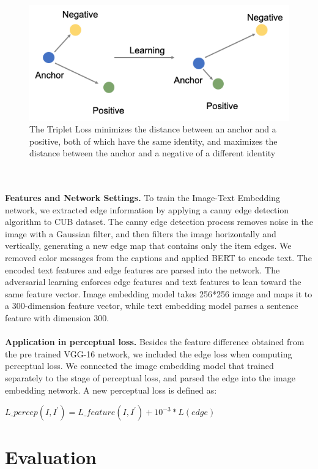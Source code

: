 \documentclass[10pt,twocolumn,letterpaper]{article}
\begin{document}
\begin{figure}
    \centering
    \includegraphics[width=0.95\columnwidth]{fig/tripletloss.png}
    \caption{The Triplet Loss minimizes the distance between an anchor and a positive, both of which have the same identity, and maximizes the distance between the anchor and a negative of a different identity}
    \label{triplet}
\end{figure}
\\\\
\textbf{Features and Network Settings.} To train the Image-Text Embedding network, we extracted edge information by applying a canny edge detection algorithm to CUB dataset. The canny edge detection process removes noise in the image with a Gaussian filter, and then filters the image horizontally and vertically, generating a new edge map that contains only the item edges. We removed color messages from the captions and applied BERT to encode text. The encoded text features and edge features are parsed into the network. The adversarial learning enforces edge features and text features to lean toward the same feature vector. Image embedding model takes 256*256 image and maps it to a 300-dimension feature vector, while text embedding model parses a sentence feature with dimension 300.
\\\\
\textbf{Application in perceptual loss.} Besides the feature difference obtained from the pre trained VGG-16 network, we included the edge loss when computing perceptual loss. We connected the image embedding model that trained separately to the stage of perceptual loss, and parsed the edge  into the image embedding network. A new perceptual loss is defined as:
\begin{center}
    $L\_percep(I,{I^'}) = L\_feature(I,{I^'}) + 10^{-3}* L(edge) $
\end{center}

\section{Evaluation}
\end{document}
